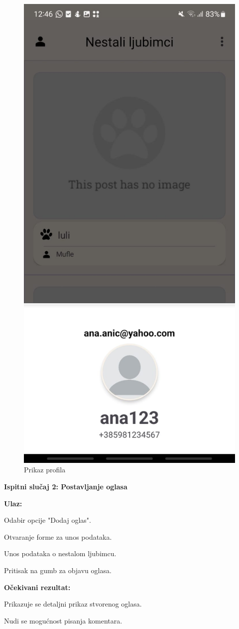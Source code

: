 \begin{figure}[H]
\begin{minipage}{.5\textwidth}
				  \includegraphics[width=.58\linewidth]{slike/app1v2.jpg}
				  \caption{Prikaz profila}
				  \label{fig:app1v2}
			\end{minipage}
			\end{figure}

			\noindent \textbf{Ispitni  slučaj 2: Postavljanje oglasa}

			\noindent \textbf{Ulaz: }
			\begin{packed_enum}
				\item Odabir opcije "Dodaj oglas".
				\item Otvaranje forme za unos podataka.
				\item Unos podataka o nestalom ljubimcu.
				\item Pritisak na gumb za objavu oglasa.
			\end{packed_enum}

			\noindent \textbf{Očekivani rezultat: }
			\begin{packed_enum}
				\item[]\begin{packed_enum}
					\item	 Prikazuje se detaljni prikaz stvorenog oglasa.
					\item Nudi se mogućnost pisanja komentara.
				\end{packed_enum}	
			\end{packed_enum}

